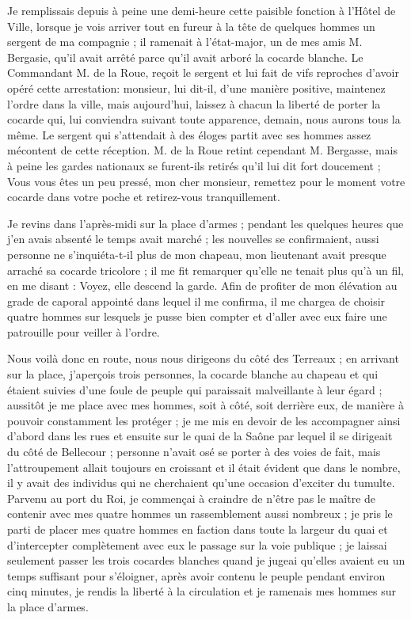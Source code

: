 \documentclass[11pt,a4paper]{report}
\begin{document}
Je remplissais depuis à peine une demi-heure cette paisible fonction à l'Hôtel de Ville, lorsque je vois arriver tout en fureur à la tête de quelques hommes un sergent de ma compagnie ; il ramenait à l'état-major, un de mes amis M. Bergasie, qu'il avait arrêté parce qu'il avait arboré la cocarde blanche. Le Commandant M. de la Roue, reçoit le sergent et lui fait de vifs reproches d'avoir opéré cette arrestation: monsieur, lui dit-il, d'une manière positive, maintenez l'ordre dans la ville, mais aujourd'hui, laissez à chacun la liberté de porter la cocarde qui, lui conviendra suivant toute apparence, demain, nous aurons tous la même. Le sergent qui s'attendait à des éloges partit avec ses hommes assez mécontent de cette réception. M. de la Roue retint cependant M. Bergasse, mais à peine les gardes nationaux se furent-ils retirés qu'il lui dit fort doucement ; Vous vous êtes un peu pressé, mon cher monsieur, remettez pour le moment votre cocarde dans votre poche et retirez-vous tranquillement.

Je revins dans l'après-midi sur la place d'armes ; pendant les quelques heures que j'en avais absenté le temps avait marché ; les nouvelles se confirmaient, aussi personne ne s'inquiéta-t-il plus de mon chapeau, mon lieutenant avait presque arraché sa cocarde tricolore ; il me fit remarquer qu'elle ne tenait plus qu'à un fil, en me disant : Voyez, elle descend la garde. Afin de profiter de mon élévation au grade de caporal appointé dans lequel il me confirma, il me chargea de choisir quatre hommes sur lesquels je pusse bien compter et d'aller avec eux faire une patrouille pour veiller à l'ordre.

Nous voilà donc en route, nous nous dirigeons du côté des Terreaux ; en arrivant sur la place, j'aperçois trois personnes, la cocarde blanche au chapeau et qui étaient suivies d'une foule de peuple qui paraissait malveillante à leur égard ; aussitôt je me place avec mes hommes, soit à côté, soit derrière eux, de manière à pouvoir constamment les protéger ; je me mis en devoir de les accompagner ainsi d'abord dans les rues et ensuite sur le quai de la Saône par lequel il se dirigeait du côté de Bellecour ; personne n'avait osé se porter à des voies de fait, mais l'attroupement allait toujours en croissant et il était évident que dans le nombre, il y avait des individus qui ne cherchaient qu'une occasion d'exciter du tumulte. Parvenu au port du Roi, je commençai à craindre de n'être pas le maître de contenir avec mes quatre hommes un rassemblement aussi nombreux ; je pris le parti de placer mes quatre hommes en faction dans toute la largeur du quai et d'intercepter complètement avec eux le passage sur la voie publique ; je laissai seulement passer les trois cocardes blanches quand je jugeai qu'elles avaient eu un temps suffisant pour s'éloigner, après avoir contenu le peuple pendant environ cinq minutes, je rendis la liberté à la circulation et je ramenais mes hommes sur la place d'armes.
\end{document}
